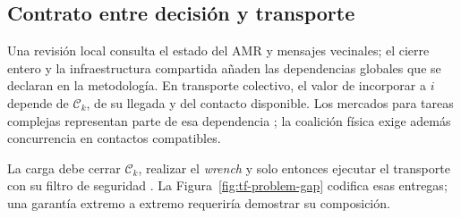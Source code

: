 \subsection{Contrato entre decisión y transporte}
\label{subsec:architecture-contract}

Una revisión local consulta el estado del AMR y mensajes vecinales; el cierre
entero y la infraestructura compartida añaden las dependencias globales que se
declaran en la metodología. En transporte colectivo, el valor de incorporar a
$i$ depende de $\mathcal C_k$, de su llegada y del contacto disponible. Los
mercados para tareas complejas representan parte de esa dependencia
\parencite{zlotStentz2006ComplexTasks}; la coalición física exige además
concurrencia en contactos compatibles.

La carga debe cerrar $\mathcal C_k$, realizar el \emph{wrench} y solo entonces
ejecutar el transporte con su filtro de seguridad
\parencite{an2023cooperativeReview}. La Figura~\ref{fig:tf-problem-gap} codifica
esas entregas; una garantía extremo a extremo requeriría demostrar su
composición.

